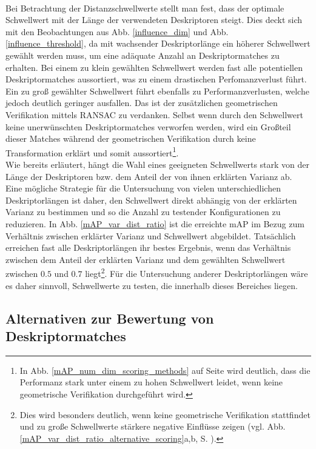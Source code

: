 \\
Bei Betrachtung der Distanzschwellwerte stellt man fest, dass der optimale Schwellwert mit der Länge der verwendeten Deskriptoren steigt. Dies deckt sich mit den Beobachtungen aus Abb. \ref{influence_dim} und Abb. \ref{influence_threshold}, da mit wachsender Deskriptorlänge ein höherer Schwellwert gewählt werden muss, um eine adäquate Anzahl an Deskriptormatches zu erhalten. Bei einem zu klein gewählten Schwellwert werden fast alle potentiellen Deskriptormatches aussortiert, was zu einem drastischen Perfomanzverlust führt. Ein zu groß gewählter Schwellwert führt ebenfalls zu Performanzverlusten, welche jedoch deutlich geringer ausfallen. Das ist der zusätzlichen geometrischen Verifikation mittels RANSAC zu verdanken. Selbst wenn durch den Schwellwert keine unerwünschten Deskriptormatches verworfen werden, wird ein Großteil dieser Matches während der geometrischen Verifikation durch keine Transformation erklärt und somit aussortiert\footnote{In Abb. \ref{mAP_num_dim_scoring_methods} auf Seite \pageref{mAP_num_dim_scoring_methods} wird deutlich, dass die Performanz stark unter einem zu hohen Schwellwert leidet, wenn keine geometrische Verifikation durchgeführt wird.}. \\
Wie bereits erläutert, hängt die Wahl eines geeigneten Schwellwerts stark von der Länge der Deskriptoren bzw. dem Anteil der von ihnen erklärten Varianz ab. Eine mögliche Strategie für die Untersuchung von vielen unterschiedlichen Deskriptorlängen ist daher, den Schwellwert direkt abhängig von der erklärten Varianz zu bestimmen und so die Anzahl zu testender Konfigurationen zu reduzieren. In Abb. \ref{mAP_var_dist_ratio} ist die erreichte mAP im Bezug zum Verhältnis zwischen erklärter Varianz und Schwellwert abgebildet. Tatsächlich erreichen fast alle Deskriptorlängen ihr bestes Ergebnis, wenn das Verhältnis zwischen dem Anteil der erklärten Varianz und dem gewählten Schwellwert zwischen $0.5$ und $0.7$ liegt\footnote{Dies wird besonders deutlich, wenn keine geometrische Verifikation stattfindet und zu große Schwellwerte stärkere negative Einflüsse zeigen (vgl. Abb. \ref{mAP_var_dist_ratio_alternative_scoring}a,b, S. \pageref{mAP_var_dist_ratio_alternative_scoring}).}. Für die Untersuchung anderer Deskriptorlängen wäre es daher sinnvoll, Schwellwerte zu testen, die innerhalb dieses Bereiches liegen.

\subsection{Alternativen zur Bewertung von Deskriptormatches}\label{metric_experiment}

